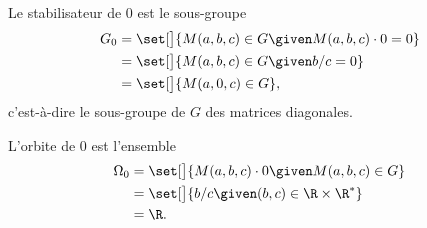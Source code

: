 Le stabilisateur de 0 est le sous-groupe
%
\begin{align*}
  G_0
    &= \set[\big]{M(a,b,c)\in G \given M(a,b,c) \cdot 0 = 0 } \\
    &= \set[\big]{M(a,b,c)\in G \given b/c = 0 } \\
    &= \set[\big]{M(a,0,c)\in G},
\end{align*}
%
c'est-à-dire le sous-groupe de $G$ des matrices diagonales.

L'orbite de $0$ est l'ensemble
%
\begin{align*}
  \Omega_0
    &= \set[\big]{ M(a,b,c) \cdot 0 \given M(a,b,c)\in G } \\
    &= \set[\big]{ b/c \given (b,c)\in\R\times\R^*} \\
    &= \R.
\end{align*}

